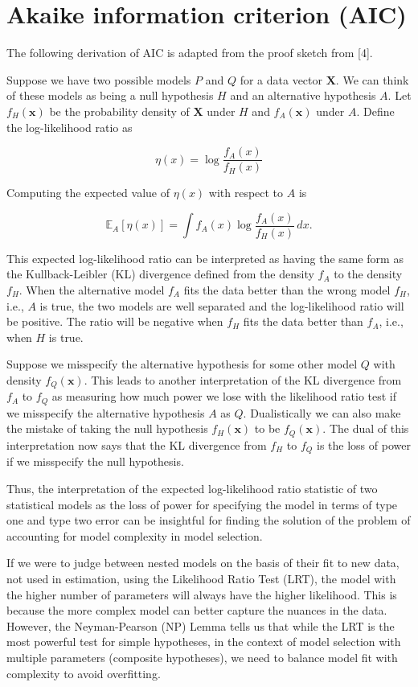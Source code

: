 \documentclass[
11pt, %
oneside, %
english, %
singlespacing, %
]{macthesis} %
\begin{document}
\section{Akaike information criterion (AIC)}\label{AIC}

The following derivation of AIC is adapted from the proof sketch from {[}4{]}.

Suppose we have two possible models \(P\) and \(Q\) for a data vector \(\mathbf{X}\). We can think of these models as being a null hypothesis \(H\) and an alternative hypothesis \(A\). Let \(f_H(\mathbf{x})\) be the probability density of \(\mathbf{X}\) under \(H\) and \(f_A(\mathbf{x})\) under \(A\). Define the log-likelihood ratio as

\[
\eta(x) = \log \frac{f_A(x)}{f_H(x)} 
\]

Computing the expected value of \(\eta(x)\) with respect to \(A\) is

\[
\mathbb{E}_A[\eta(x)]= \int f_A(x) \log \frac{f_A(x)}{f_H(x)} \, dx.
\]

This expected log-likelihood ratio can be interpreted as having the same form as the Kullback-Leibler (KL) divergence defined from the density \(f_A\) to the density \(f_H\). When the alternative model \(f_A\) fits the data better than the wrong model \(f_H\), i.e., \(A\) is true, the two models are well separated and the log-likelihood ratio will be positive. The ratio will be negative when \(f_H\) fits the data better than \(f_A\), i.e., when \(H\) is true.

Suppose we misspecify the alternative hypothesis for some other model \(Q\) with density \(f_Q(\mathbf{x})\). This leads to another interpretation of the KL divergence from \(f_A\) to \(f_Q\) as measuring how much power we lose with the likelihood ratio test if we misspecify the alternative hypothesis \(A\) as \(Q\). Dualistically we can also make the mistake of taking the null hypothesis \(f_H(\mathbf{x})\) to be \(f_Q(\mathbf{x})\). The dual of this interpretation now says that the KL divergence from \(f_H\) to \(f_Q\) is the loss of power if we misspecify the null hypothesis.

Thus, the interpretation of the expected log-likelihood ratio statistic of two statistical models as the loss of power for specifying the model in terms of type one and type two error can be insightful for finding the solution of the problem of accounting for model complexity in model selection.

If we were to judge between nested models on the basis of their fit to new data, not used in estimation, using the Likelihood Ratio Test (LRT), the model with the higher number of parameters will always have the higher likelihood. This is because the more complex model can better capture the nuances in the data. However, the Neyman-Pearson (NP) Lemma tells us that while the LRT is the most powerful test for simple hypotheses, in the context of model selection with multiple parameters (composite hypotheses), we need to balance model fit with complexity to avoid overfitting.
\end{document}
